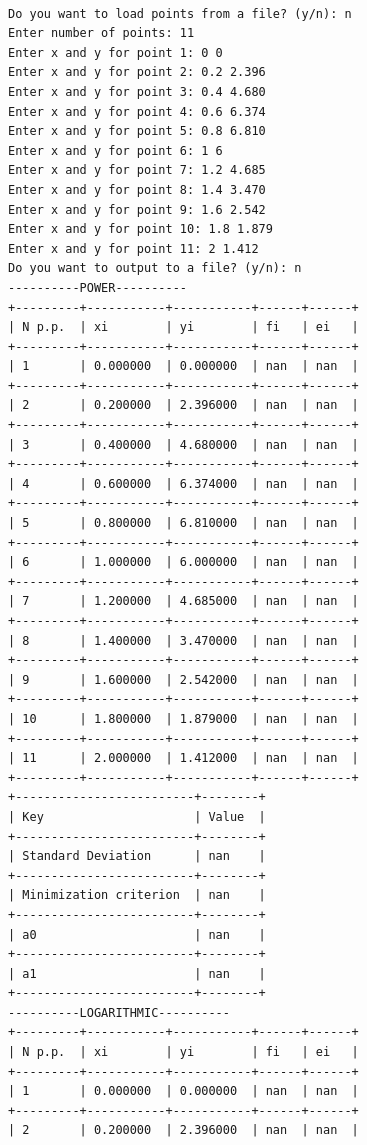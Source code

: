 \documentclass[12pt,one column]{article}
\begin{document}
\begin{verbatim}

Do you want to load points from a file? (y/n): n
Enter number of points: 11
Enter x and y for point 1: 0 0
Enter x and y for point 2: 0.2 2.396
Enter x and y for point 3: 0.4 4.680
Enter x and y for point 4: 0.6 6.374
Enter x and y for point 5: 0.8 6.810
Enter x and y for point 6: 1 6
Enter x and y for point 7: 1.2 4.685
Enter x and y for point 8: 1.4 3.470
Enter x and y for point 9: 1.6 2.542
Enter x and y for point 10: 1.8 1.879
Enter x and y for point 11: 2 1.412
Do you want to output to a file? (y/n): n
----------POWER----------
+---------+-----------+-----------+------+------+
| N p.p.  | xi        | yi        | fi   | ei   | 
+---------+-----------+-----------+------+------+
| 1       | 0.000000  | 0.000000  | nan  | nan  | 
+---------+-----------+-----------+------+------+
| 2       | 0.200000  | 2.396000  | nan  | nan  | 
+---------+-----------+-----------+------+------+
| 3       | 0.400000  | 4.680000  | nan  | nan  | 
+---------+-----------+-----------+------+------+
| 4       | 0.600000  | 6.374000  | nan  | nan  | 
+---------+-----------+-----------+------+------+
| 5       | 0.800000  | 6.810000  | nan  | nan  | 
+---------+-----------+-----------+------+------+
| 6       | 1.000000  | 6.000000  | nan  | nan  | 
+---------+-----------+-----------+------+------+
| 7       | 1.200000  | 4.685000  | nan  | nan  | 
+---------+-----------+-----------+------+------+
| 8       | 1.400000  | 3.470000  | nan  | nan  | 
+---------+-----------+-----------+------+------+
| 9       | 1.600000  | 2.542000  | nan  | nan  | 
+---------+-----------+-----------+------+------+
| 10      | 1.800000  | 1.879000  | nan  | nan  | 
+---------+-----------+-----------+------+------+
| 11      | 2.000000  | 1.412000  | nan  | nan  | 
+---------+-----------+-----------+------+------+
+-------------------------+--------+
| Key                     | Value  | 
+-------------------------+--------+
| Standard Deviation      | nan    | 
+-------------------------+--------+
| Minimization criterion  | nan    | 
+-------------------------+--------+
| a0                      | nan    | 
+-------------------------+--------+
| a1                      | nan    | 
+-------------------------+--------+
----------LOGARITHMIC----------
+---------+-----------+-----------+------+------+
| N p.p.  | xi        | yi        | fi   | ei   | 
+---------+-----------+-----------+------+------+
| 1       | 0.000000  | 0.000000  | nan  | nan  | 
+---------+-----------+-----------+------+------+
| 2       | 0.200000  | 2.396000  | nan  | nan  | 

\end{verbatim}
\end{document}
